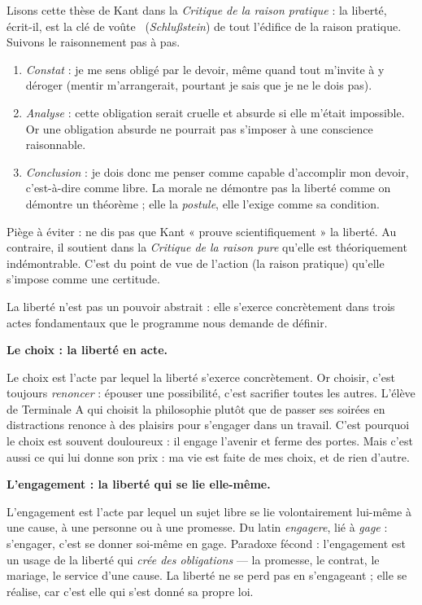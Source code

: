 \documentclass[11pt]{article}
\newcommand{\cle}[1]{{\popxbold\color{popdark}#1}}
\newcounter{popsec}
\newcounter{popsub}
\newcommand{\courssub}[1]{%
  \stepcounter{popsub}%
  \par\vspace{9pt}\noindent{\popxbold\fontsize{11.5}{13}\selectfont\color{popink}{\color{poporange}\thepopsec.\thepopsub}\hspace{6pt}#1}\par\nopagebreak\vspace{4pt}
}
\begin{document}
\begin{experience}
Lisons cette thèse de Kant dans la \emph{Critique de la raison pratique} : la liberté, écrit-il, est la \guillemotleft clé de voûte \guillemotright\ (\emph{Schlußstein}) de tout l'édifice de la raison pratique. Suivons le raisonnement pas à pas.
\begin{enumerate}
\item \emph{Constat} : je me sens obligé par le devoir, même quand tout m'invite à y déroger (mentir m'arrangerait, pourtant je sais que je ne le dois pas).
\item \emph{Analyse} : cette obligation serait cruelle et absurde si elle m'était impossible. Or une obligation absurde ne pourrait pas s'imposer à une conscience raisonnable.
\item \emph{Conclusion} : je dois donc me penser comme capable d'accomplir mon devoir, c'est-à-dire comme libre. La morale ne démontre pas la liberté comme on démontre un théorème ; elle la \emph{postule}, elle l'exige comme sa condition.
\end{enumerate}
Piège à éviter : ne dis pas que Kant « prouve scientifiquement » la liberté. Au contraire, il soutient dans la \emph{Critique de la raison pure} qu'elle est théoriquement indémontrable. C'est du point de vue de l'action (la raison pratique) qu'elle s'impose comme une certitude.
\end{experience}

\courssub{Le choix, l'engagement et la quête de soi}

La liberté n'est pas un pouvoir abstrait : elle s'exerce concrètement dans trois actes fondamentaux que le programme nous demande de définir.

\textbf{Le choix : la liberté en acte.}\par
Le \cle{choix} est l'acte par lequel la liberté s'exerce concrètement. Or choisir, c'est toujours \emph{renoncer} : épouser une possibilité, c'est sacrifier toutes les autres. L'élève de Terminale A qui choisit la philosophie plutôt que de passer ses soirées en distractions renonce à des plaisirs pour s'engager dans un travail. C'est pourquoi le choix est souvent douloureux : il engage l'avenir et ferme des portes. Mais c'est aussi ce qui lui donne son prix : ma vie est faite de mes choix, et de rien d'autre.

\textbf{L'engagement : la liberté qui se lie elle-même.}\par

\begin{definition}[L'engagement]
L'\cle{engagement} est l'acte par lequel un sujet libre se lie volontairement lui-même à une cause, à une personne ou à une promesse. Du latin \emph{engagere}, lié à \emph{gage} : s'engager, c'est se donner soi-même en gage. Paradoxe fécond : l'engagement est un usage de la liberté qui \emph{crée des obligations} — la promesse, le contrat, le mariage, le service d'une cause. La liberté ne se perd pas en s'engageant ; elle se réalise, car c'est elle qui s'est donné sa propre loi.
\end{definition}
\end{document}
